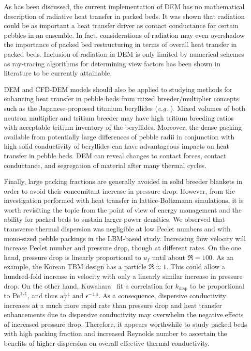 As has been discussed, the current implementation of DEM has no mathematical description of radiative heat transfer in packed beds. It was shown that radiation could be as important a heat transfer driver as contact conductance for certain pebbles in an ensemble. In fact, considerations of radiation may even overshadow the importance of packed bed restructuring in terms of overall heat transfer in packed beds. Inclusion of radiation in DEM is only limited by numerical schemes as ray-tracing algorithms for determining view factors has been shown in literature to be currently attainable.

DEM and CFD-DEM models should also be applied to studying methods for enhancing heat transfer in pebble beds from mixed breeder/multiplier concepts such as the Japanese-proposed titanium beryllides (\textit{e.g.} ). Mixed volumes of both neutron multiplier and tritium breeder may have high tritium breeding ratios with acceptable tritium inventory of the beryllides. Moreover, the dense packing available from potentially large differences of pebble radii in conjunction with high solid conductivity of beryllides can have advantageous impacts on heat transfer in pebble beds. DEM can reveal changes to contact forces, contact conductance, and segregation of material after many thermal cycles. 

Finally, large packing fractions are generally avoided in solid breeder blankets in order to avoid their concomitant increase in pressure drop. However, from the investigation performed with heat transfer in lattice-Boltzmann simulations, it is worth revisiting the topic from the point of view of energy management and the ability for packed beds to sustain larger power densities. We observed that transverse thermal dispersion was negligible at low Peclet numbers and with mono-sized pebble packings in the LBM-based study. Increasing flow velocity will increase Peclet number and pressure drop, though at different rates. On the one hand, pressure drop is linearly proportional to $u_f$ until about $\Re = 100$. As an example, the Korean TBM design has a particle $\Re \approx 1$. This could allow a hundred-fold increase in velocity with only a linearly similar increase in pressure drop. On the other hand, Kuwahara \etal~fit a correlation for $k_\text{disp}$ to be proportional to $\mathrm{Pe}^{1.4}$, and thus $u_f^{1.4}$ and $\epsilon^{-1.4}$. As a consequence, dispersive conductivity increases at a much more rapid rate than pressure drop and heat transfer enhancements due to dispersive conductivity may overwhelm the negative effects of increased pressure drop. Therefore, it appears worthwhile to study packed beds with high packing fraction and increased Reynolds number to ascertain the benefits of higher dispersion on overall effective thermal conductivity.
